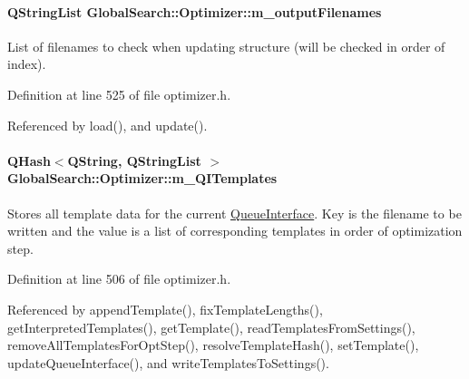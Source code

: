 \hypertarget{classGlobalSearch_1_1Optimizer_a28a8bf74bf7bdf00d453890796574c7d}{}
\paragraph[{m\+\_\+output\+Filenames}]{\setlength{\rightskip}{0pt plus 5cm}Q\+String\+List Global\+Search\+::\+Optimizer\+::m\+\_\+output\+Filenames\hspace{0.3cm}{\ttfamily [protected]}}\label{classGlobalSearch_1_1Optimizer_a28a8bf74bf7bdf00d453890796574c7d}
List of filenames to check when updating structure (will be checked in order of index). 

Definition at line 525 of file optimizer.\+h.



Referenced by load(), and update().

\hypertarget{classGlobalSearch_1_1Optimizer_ac23d5114bf09b816666351868d49d1f8}{}
\paragraph[{m\+\_\+\+Q\+I\+Templates}]{\setlength{\rightskip}{0pt plus 5cm}Q\+Hash$<$Q\+String, Q\+String\+List $>$ Global\+Search\+::\+Optimizer\+::m\+\_\+\+Q\+I\+Templates\hspace{0.3cm}{\ttfamily [protected]}}\label{classGlobalSearch_1_1Optimizer_ac23d5114bf09b816666351868d49d1f8}
Stores all template data for the current \hyperlink{classGlobalSearch_1_1QueueInterface}{Queue\+Interface}. Key is the filename to be written and the value is a list of corresponding templates in order of optimization step. 

Definition at line 506 of file optimizer.\+h.



Referenced by append\+Template(), fix\+Template\+Lengths(), get\+Interpreted\+Templates(), get\+Template(), read\+Templates\+From\+Settings(), remove\+All\+Templates\+For\+Opt\+Step(), resolve\+Template\+Hash(), set\+Template(), update\+Queue\+Interface(), and write\+Templates\+To\+Settings().

